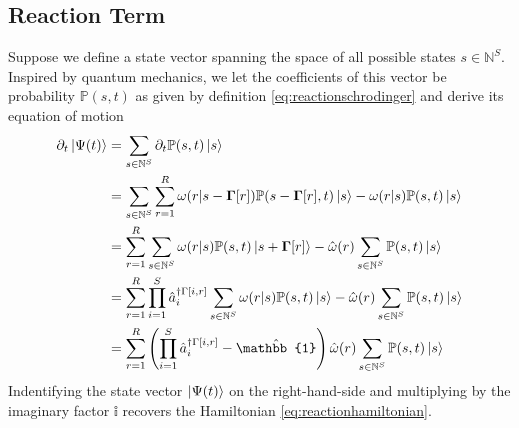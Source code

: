 \documentclass{article}[12pt]
\numberwithin{equation}{section}
\begin{document}
\subsection{Reaction Term}
Suppose we define a state vector spanning the space of all possible states
$s\in\mathbb{N}^S$. Inspired by quantum mechanics, we let the coefficients
of this vector be probability $\mathbb{P}(s,t)$ as given by definition
\eqref{eq:reactionschrodinger} and derive its equation of motion
\begin{align*}
	\partial_t\ket{\Psi(t)}
	&=\sum_{s\in\mathbb{N}^S}\partial_t\mathbb{P}(s,t)\ket{s}
	\\
	&=\sum_{s\in\mathbb{N}^S}\sum_{r=1}^R
	\omega(r|s-\mathbf{\Gamma}[r])\mathbb{P}(s-\mathbf{\Gamma}[r],t)\ket{s}
	-\omega(r|s)\mathbb{P}(s,t)\ket{s}
	\\
	&=\sum_{r=1}^R
	\sum_{s\in\mathbb{N}^S}\omega(r|s)\mathbb{P}(s,t)\ket{s+\mathbf{\Gamma}[r]}
	-\hat{\omega}(r)\sum_{s\in\mathbb{N}^S}\mathbb{P}(s,t)\ket{s}
	\\
	&=\sum_{r=1}^R
	\prod_{i=1}^S
	\hat{a}_i^{\dagger\Gamma[i,r]}
	\sum_{s\in\mathbb{N}^S}
	\omega(r|s)\mathbb{P}(s,t)\ket{s}
	-\hat{\omega}(r)\sum_{s\in\mathbb{N}^S}\mathbb{P}(s,t)\ket{s}
	\\
	&=\sum_{r=1}^R
	\left(
	\prod_{i=1}^S
	\hat{a}_i^{\dagger\Gamma[i,r]}
	-\hat{\mathbb{1}}
	\right)
	\hat{\omega}(r)\sum_{s\in\mathbb{N}^S}
	\mathbb{P}(s,t)\ket{s}
\end{align*}
Indentifying the state vector $\ket{\Psi(t)}$ on the right-hand-side
and multiplying by the imaginary factor $\mathbb{i}$ recovers the Hamiltonian
\eqref{eq:reactionhamiltonian}.
\end{document}
